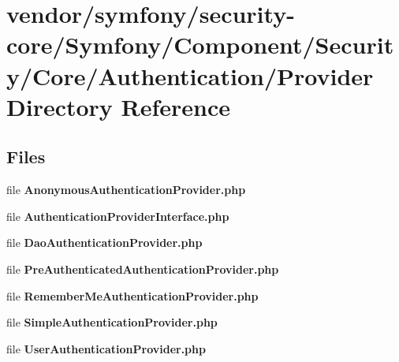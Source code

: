 \section{vendor/symfony/security-\/core/\+Symfony/\+Component/\+Security/\+Core/\+Authentication/\+Provider Directory Reference}
\label{dir_67448af3c4fc061b55619ab9a588f6a3}
\subsection*{Files}
\begin{DoxyCompactItemize}
\item 
file {\bf Anonymous\+Authentication\+Provider.\+php}
\item 
file {\bf Authentication\+Provider\+Interface.\+php}
\item 
file {\bf Dao\+Authentication\+Provider.\+php}
\item 
file {\bf Pre\+Authenticated\+Authentication\+Provider.\+php}
\item 
file {\bf Remember\+Me\+Authentication\+Provider.\+php}
\item 
file {\bf Simple\+Authentication\+Provider.\+php}
\item 
file {\bf User\+Authentication\+Provider.\+php}
\end{DoxyCompactItemize}
